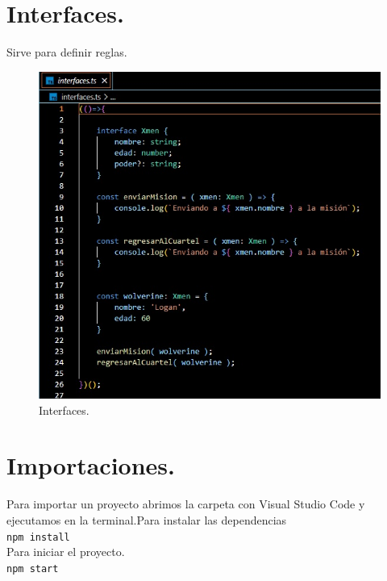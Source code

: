 \section{Interfaces.}
Sirve para definir reglas.
\begin{figure}[H] 
	\centering
	\includegraphics[scale=0.8]{images/c2_6.jpg}
	\caption{Interfaces.}
\end{figure}

\section{Importaciones.}
Para importar un proyecto abrimos la carpeta con Visual Studio Code y ejecutamos
en la terminal.Para instalar las dependencias\\
\texttt{npm install}\\
Para iniciar el proyecto.\\
\texttt{npm start}\\




